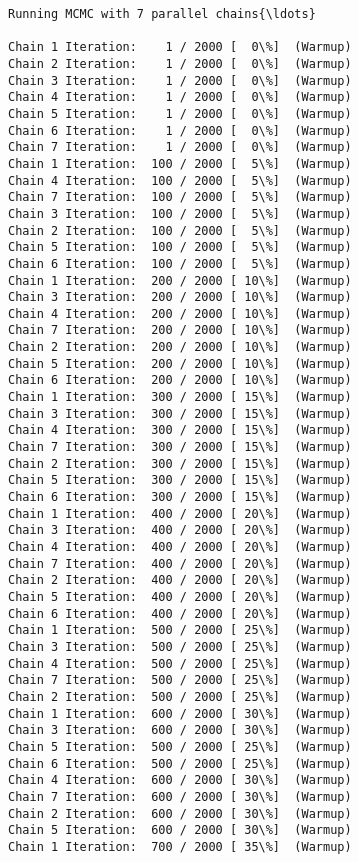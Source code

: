\documentclass[11pt]{article}
\begin{document}
    \begin{Verbatim}[commandchars=\\\{\}]
Running MCMC with 7 parallel chains{\ldots}

Chain 1 Iteration:    1 / 2000 [  0\%]  (Warmup)
Chain 2 Iteration:    1 / 2000 [  0\%]  (Warmup)
Chain 3 Iteration:    1 / 2000 [  0\%]  (Warmup)
Chain 4 Iteration:    1 / 2000 [  0\%]  (Warmup)
Chain 5 Iteration:    1 / 2000 [  0\%]  (Warmup)
Chain 6 Iteration:    1 / 2000 [  0\%]  (Warmup)
Chain 7 Iteration:    1 / 2000 [  0\%]  (Warmup)
Chain 1 Iteration:  100 / 2000 [  5\%]  (Warmup)
Chain 4 Iteration:  100 / 2000 [  5\%]  (Warmup)
Chain 7 Iteration:  100 / 2000 [  5\%]  (Warmup)
Chain 3 Iteration:  100 / 2000 [  5\%]  (Warmup)
Chain 2 Iteration:  100 / 2000 [  5\%]  (Warmup)
Chain 5 Iteration:  100 / 2000 [  5\%]  (Warmup)
Chain 6 Iteration:  100 / 2000 [  5\%]  (Warmup)
Chain 1 Iteration:  200 / 2000 [ 10\%]  (Warmup)
Chain 3 Iteration:  200 / 2000 [ 10\%]  (Warmup)
Chain 4 Iteration:  200 / 2000 [ 10\%]  (Warmup)
Chain 7 Iteration:  200 / 2000 [ 10\%]  (Warmup)
Chain 2 Iteration:  200 / 2000 [ 10\%]  (Warmup)
Chain 5 Iteration:  200 / 2000 [ 10\%]  (Warmup)
Chain 6 Iteration:  200 / 2000 [ 10\%]  (Warmup)
Chain 1 Iteration:  300 / 2000 [ 15\%]  (Warmup)
Chain 3 Iteration:  300 / 2000 [ 15\%]  (Warmup)
Chain 4 Iteration:  300 / 2000 [ 15\%]  (Warmup)
Chain 7 Iteration:  300 / 2000 [ 15\%]  (Warmup)
Chain 2 Iteration:  300 / 2000 [ 15\%]  (Warmup)
Chain 5 Iteration:  300 / 2000 [ 15\%]  (Warmup)
Chain 6 Iteration:  300 / 2000 [ 15\%]  (Warmup)
Chain 1 Iteration:  400 / 2000 [ 20\%]  (Warmup)
Chain 3 Iteration:  400 / 2000 [ 20\%]  (Warmup)
Chain 4 Iteration:  400 / 2000 [ 20\%]  (Warmup)
Chain 7 Iteration:  400 / 2000 [ 20\%]  (Warmup)
Chain 2 Iteration:  400 / 2000 [ 20\%]  (Warmup)
Chain 5 Iteration:  400 / 2000 [ 20\%]  (Warmup)
Chain 6 Iteration:  400 / 2000 [ 20\%]  (Warmup)
Chain 1 Iteration:  500 / 2000 [ 25\%]  (Warmup)
Chain 3 Iteration:  500 / 2000 [ 25\%]  (Warmup)
Chain 4 Iteration:  500 / 2000 [ 25\%]  (Warmup)
Chain 7 Iteration:  500 / 2000 [ 25\%]  (Warmup)
Chain 2 Iteration:  500 / 2000 [ 25\%]  (Warmup)
Chain 1 Iteration:  600 / 2000 [ 30\%]  (Warmup)
Chain 3 Iteration:  600 / 2000 [ 30\%]  (Warmup)
Chain 5 Iteration:  500 / 2000 [ 25\%]  (Warmup)
Chain 6 Iteration:  500 / 2000 [ 25\%]  (Warmup)
Chain 4 Iteration:  600 / 2000 [ 30\%]  (Warmup)
Chain 7 Iteration:  600 / 2000 [ 30\%]  (Warmup)
Chain 2 Iteration:  600 / 2000 [ 30\%]  (Warmup)
Chain 5 Iteration:  600 / 2000 [ 30\%]  (Warmup)
Chain 1 Iteration:  700 / 2000 [ 35\%]  (Warmup)

\end{Verbatim}
\end{document}
